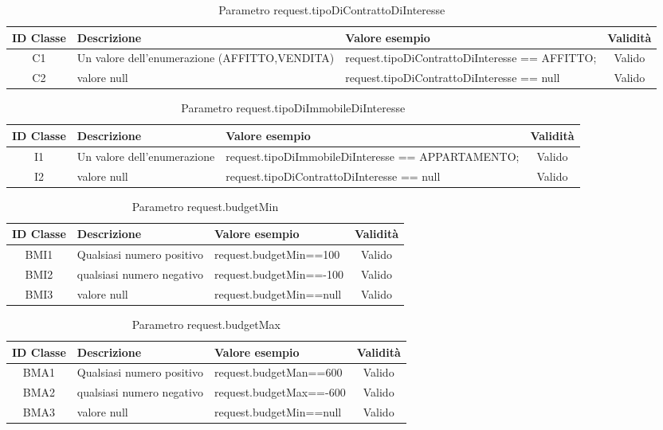\begin{table}[H]
	\centering
	\begin{tabular}{|c|p{6cm}|p{6.2cm}|c|} 
		\hline
		\textbf{ID Classe} & \textbf{Descrizione} & \textbf{Valore esempio} & \textbf{Validità} \\
		\hline
		C1 & Un valore dell'enumerazione (AFFITTO,VENDITA)
		& request.tipoDiContrattoDiInteresse == AFFITTO; & Valido \\
		\hline
		C2 & valore null
		& request.tipoDiContrattoDiInteresse == null & Valido \\
		\hline
	\end{tabular}
	\caption{Parametro request.tipoDiContrattoDiInteresse}
	\label{tab:placeholder}
\end{table}

\begin{table}[H]
	\centering
	\begin{tabular}{|c|p{6cm}|p{6.2cm}|c|} 
		\hline
		\textbf{ID Classe} & \textbf{Descrizione} & \textbf{Valore esempio} & \textbf{Validità} \\
		\hline
		I1 & Un valore dell'enumerazione
		& request.tipoDiImmobileDiInteresse == APPARTAMENTO; & Valido \\
		\hline
		I2 & valore null
		& request.tipoDiContrattoDiInteresse == null & Valido \\
		\hline
	\end{tabular}
	\caption{Parametro request.tipoDiImmobileDiInteresse}
	\label{tab:placeholder}
\end{table}

\begin{table}[H]
	\centering
	\begin{tabular}{|c|p{4cm}|p{5.5cm}|c|} 
		\hline
		\textbf{ID Classe} & \textbf{Descrizione} & \textbf{Valore esempio} & \textbf{Validità} \\
		\hline
		BMI1 & Qualsiasi numero positivo
		& request.budgetMin==100 & Valido \\
		\hline
		BMI2 & qualsiasi numero negativo
		& request.budgetMin==-100 & Valido \\
		\hline
		BMI3 & valore null
		& request.budgetMin==null & Valido \\
		\hline
	\end{tabular}
	\caption{Parametro request.budgetMin}
	\label{tab:placeholder}
\end{table}

\begin{table}[H]
	\centering
	\begin{tabular}{|c|p{4cm}|p{5.5cm}|c|} 
		\hline
		\textbf{ID Classe} & \textbf{Descrizione} & \textbf{Valore esempio} & \textbf{Validità} \\
		\hline
		BMA1 & Qualsiasi numero positivo
		& request.budgetMan==600 & Valido \\
		\hline
		BMA2 & qualsiasi numero negativo
		& request.budgetMax==-600 & Valido \\
		\hline
		BMA3 & valore null
		& request.budgetMin==null & Valido \\
		\hline
	\end{tabular}
	\caption{Parametro request.budgetMax}
	\label{tab:placeholder}
\end{table}

